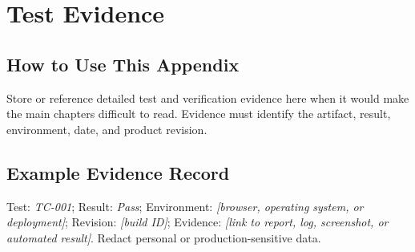 \chapter{Test Evidence}
\section{How to Use This Appendix}
Store or reference detailed test and verification evidence here when it would make the main chapters difficult to read. Evidence must identify the artifact, result, environment, date, and product revision.
\section{Example Evidence Record}
Test: \textit{TC-001}; Result: \textit{Pass}; Environment: \textit{[browser, operating system, or deployment]}; Revision: \textit{[build ID]}; Evidence: \textit{[link to report, log, screenshot, or automated result]}. Redact personal or production-sensitive data.
